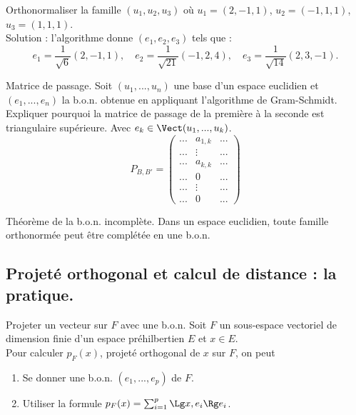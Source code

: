 \documentclass[11pt]{article}
\begin{document}
\begin{ex}{}{}
    Orthonormaliser la famille $(u_1,u_2,u_3)$ où $u_1=(2,-1,1)$, $u_2=(-1,1,1)$, $u_3=(1,1,1)$.\\
    Solution : l'algorithme donne $(e_1,e_2,e_3)$ tels que :
    \begin{equation*}
        e_1=\frac{1}{\sqrt{6}}(2,-1,1), \quad e_2=\frac{1}{\sqrt{21}}(-1,2,4), \quad e_3=\frac{1}{\sqrt{14}}(2,3,-1).
    \end{equation*}
\end{ex}

\begin{ex}{Matrice de passage.}{}
    Soit $(u_1,...,u_n)$ une base d'un espace euclidien et $(e_1,...,e_n)$ la b.o.n. obtenue en appliquant l'algorithme de Gram-Schmidt. Expliquer pourquoi la matrice de passage de la première à la seconde est triangulaire supérieure.
    \tcblower
    Avec $e_k\in\Vect(u_1,...,u_k)$.
    \begin{equation*}
        P_{B,B'}=\begin{pmatrix}
            ... &a_{1,k} &...\\
            ... &\vdots &...\\
            ... &a_{k,k} &...\\
            ... &0 &...\\
            ... &\vdots &...\\
            ... &0 &... 
        \end{pmatrix}
    \end{equation*}
\end{ex}

\begin{prop}{Théorème de la b.o.n. incomplète.}{}
    Dans un espace euclidien, toute famille orthonormée peut être complétée en une b.o.n.
\end{prop}

\subsection{Projeté orthogonal et calcul de distance : la pratique.}

\begin{meth}{Projeter un vecteur sur $F$ avec une b.o.n.}{}
    Soit $F$ un sous-espace vectoriel de dimension finie d'un espace préhilbertien $E$ et $x\in E$.\\
    Pour calculer $p_F(x)$, projeté orthogonal de $x$ sur $F$, on peut
    \begin{enumerate}[topsep=0pt,itemsep=-0.9ex]
        \item Se donner une b.o.n. $(e_1,...,e_p)$ de $F$.
        \item Utiliser la formule $p_F(x)=\sum_{i=1}^p\Lg x, e_i\Rg e_i$.
    \end{enumerate}
\end{meth}
\end{document}
